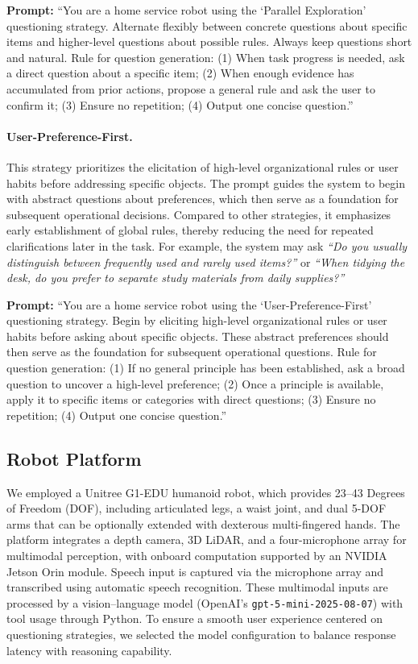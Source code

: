 \documentclass[sigconf,authordraft]{acmart}
\begin{document}
\noindent\textbf{Prompt:} ``You are a home service robot using the `Parallel Exploration' questioning strategy. Alternate flexibly between concrete questions about specific items and higher-level questions about possible rules. Always keep questions short and natural. Rule for question generation: (1) When task progress is needed, ask a direct question about a specific item; (2) When enough evidence has accumulated from prior actions, propose a general rule and ask the user to confirm it; (3) Ensure no repetition; (4) Output one concise question.''


\paragraph{User-Preference-First.}  
This strategy prioritizes the elicitation of high-level organizational rules or user habits before addressing specific objects. The prompt guides the system to begin with abstract questions about preferences, which then serve as a foundation for subsequent operational decisions. Compared to other strategies, it emphasizes early establishment of global rules, thereby reducing the need for repeated clarifications later in the task. For example, the system may ask \textit{``Do you usually distinguish between frequently used and rarely used items?''} or \textit{``When tidying the desk, do you prefer to separate study materials from daily supplies?''}  

\noindent\textbf{Prompt:} ``You are a home service robot using the `User-Preference-First' questioning strategy. Begin by eliciting high-level organizational rules or user habits before asking about specific objects. These abstract preferences should then serve as the foundation for subsequent operational questions. Rule for question generation: (1) If no general principle has been established, ask a broad question to uncover a high-level preference; (2) Once a principle is available, apply it to specific items or categories with direct questions; (3) Ensure no repetition; (4) Output one concise question.''


\subsection{Robot Platform}
We employed a Unitree G1-EDU humanoid robot, which provides 23–43 Degrees of Freedom (DOF), including articulated legs, a waist joint, and dual 5-DOF arms that can be optionally extended with dexterous multi-fingered hands. The platform integrates a depth camera, 3D LiDAR, and a four-microphone array for multimodal perception, with onboard computation supported by an NVIDIA Jetson Orin module. Speech input is captured via the microphone array and transcribed using automatic speech recognition. These multimodal inputs are processed by a vision–language model (OpenAI’s \texttt{gpt-5-mini-2025-08-07}) with tool usage through Python. To ensure a smooth user experience centered on questioning strategies, we selected the model configuration to balance response latency with reasoning capability.
\end{document}
